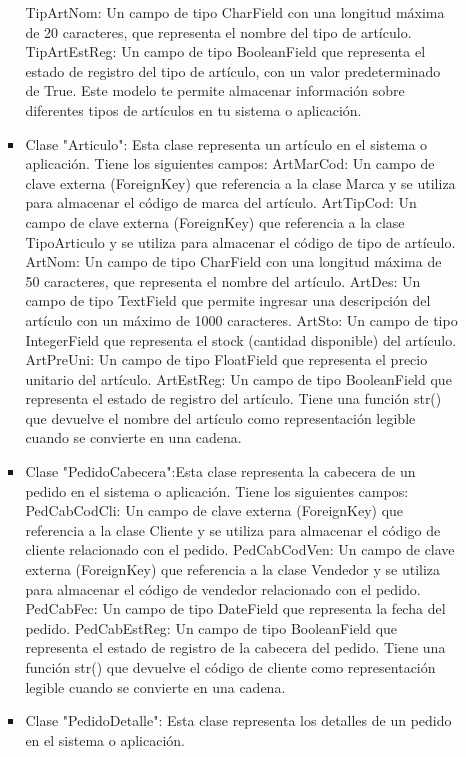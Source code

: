 \documentclass{article}
\begin{document}
\begin{itemize}
\begin{itemize}
\begin{itemize}
                TipArtNom: Un campo de tipo CharField con una longitud máxima de 20 caracteres, que representa el nombre del tipo de artículo.
                TipArtEstReg: Un campo de tipo BooleanField que representa el estado de registro del tipo de artículo, con un valor predeterminado de True.
                Este modelo te permite almacenar información sobre diferentes tipos de artículos en tu sistema o aplicación.
                \item Clase "Articulo": Esta clase representa un artículo en el sistema o aplicación.
                Tiene los siguientes campos:
                ArtMarCod: Un campo de clave externa (ForeignKey) que referencia a la clase Marca y se utiliza para almacenar el código de marca del artículo.
                ArtTipCod: Un campo de clave externa (ForeignKey) que referencia a la clase TipoArticulo y se utiliza para almacenar el código de tipo de artículo.
                ArtNom: Un campo de tipo CharField con una longitud máxima de 50 caracteres, que representa el nombre del artículo.
                ArtDes: Un campo de tipo TextField que permite ingresar una descripción del artículo con un máximo de 1000 caracteres.
                ArtSto: Un campo de tipo IntegerField que representa el stock (cantidad disponible) del artículo.
                ArtPreUni: Un campo de tipo FloatField que representa el precio unitario del artículo.
                ArtEstReg: Un campo de tipo BooleanField que representa el estado de registro del artículo.
                Tiene una función str() que devuelve el nombre del artículo como representación legible cuando se convierte en una cadena.
                \item Clase "PedidoCabecera":Esta clase representa la cabecera de un pedido en el sistema o aplicación.
                Tiene los siguientes campos:
                PedCabCodCli: Un campo de clave externa (ForeignKey) que referencia a la clase Cliente y se utiliza para almacenar el código de cliente relacionado con el pedido.
                PedCabCodVen: Un campo de clave externa (ForeignKey) que referencia a la clase Vendedor y se utiliza para almacenar el código de vendedor relacionado con el pedido.
                PedCabFec: Un campo de tipo DateField que representa la fecha del pedido.
                PedCabEstReg: Un campo de tipo BooleanField que representa el estado de registro de la cabecera del pedido.
                Tiene una función str() que devuelve el código de cliente como representación legible cuando se convierte en una cadena.
                \item Clase "PedidoDetalle": Esta clase representa los detalles de un pedido en el sistema o aplicación.

\end{itemize}
\end{itemize}
\end{itemize}
\end{document}
